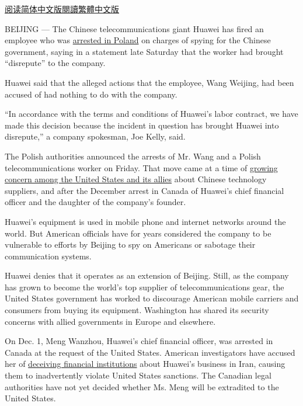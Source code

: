 \href{https://cn.nytimes.com/china/20190114/huawei-wang-weijing-poland/}{阅读简体中文版}\href{https://cn.nytimes.com/china/20190114/huawei-wang-weijing-poland/zh-hant/}{閱讀繁體中文版}

BEIJING --- The Chinese telecommunications giant Huawei has fired an
employee who was
\href{https://www.nytimes.com/2019/01/11/world/europe/poland-china-huawei-spy.html}{arrested
in Poland} on charges of spying for the Chinese government, saying in a
statement late Saturday that the worker had brought ``disrepute'' to the
company.

Huawei said that the alleged actions that the employee, Wang Weijing,
had been accused of had nothing to do with the company.

``In accordance with the terms and conditions of Huawei's labor
contract, we have made this decision because the incident in question
has brought Huawei into disrepute,'' a company spokesman, Joe Kelly,
said.

The Polish authorities announced the arrests of Mr. Wang and a Polish
telecommunications worker on Friday. That move came at a time of
\href{https://www.nytimes.com/2018/12/06/technology/huawei-arrest-meng-wanzhou.html}{growing
concern among the United States and its allies} about Chinese technology
suppliers, and after the December arrest in Canada of Huawei's chief
financial officer and the daughter of the company's founder.

Huawei's equipment is used in mobile phone and internet networks around
the world. But American officials have for years considered the company
to be vulnerable to efforts by Beijing to spy on Americans or sabotage
their communication systems.

Huawei denies that it operates as an extension of Beijing. Still, as the
company has grown to become the world's top supplier of
telecommunications gear, the United States government has worked to
discourage American mobile carriers and consumers from buying its
equipment. Washington has shared its security concerns with allied
governments in Europe and elsewhere.

On Dec. 1, Meng Wanzhou, Huawei's chief financial officer, was arrested
in Canada at the request of the United States. American investigators
have accused her of
\href{https://www.nytimes.com/2018/12/14/business/huawei-meng-hsbc-canada.html}{deceiving
financial institutions} about Huawei's business in Iran, causing them to
inadvertently violate United States sanctions. The Canadian legal
authorities have not yet decided whether Ms. Meng will be extradited to
the United States.

